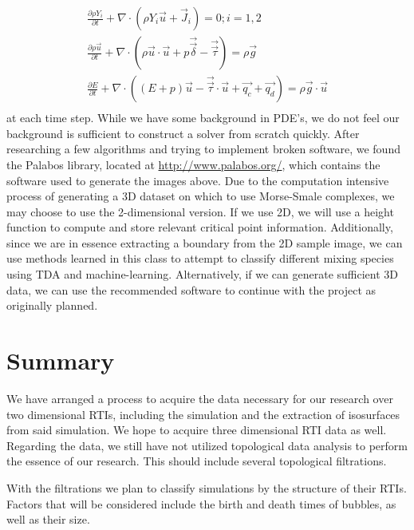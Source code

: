\documentclass[12pt, fullpage,letterpaper]{article}
\begin{document}
	\begin{gather*}
		\frac{\partial \rho Y_i}{\partial t} + \nabla \cdot (\rho Y_i \vec{u} + \vec{J}_i) = 0; i = 1, 2 \\
		\frac{\partial \rho \vec{u}}{\partial t} + \nabla \cdot (\rho \vec{u} \cdot \vec{u} + p \vec{\vec{\delta}} - \vec{\vec{\tau}}) = \rho \vec{g} \\
		\frac{\partial E}{\partial t} + \nabla \cdot ((E + p)\vec{u} -\vec{\vec{\tau}}\cdot \vec{u} + \vec{q_c} + \vec{q_d} ) = \rho \vec{g} \cdot \vec{u} \\
	\end{gather*} 
	at each time step. While we have some background in PDE's, we do not feel our background is sufficient to construct a solver from scratch quickly. After researching a few algorithms and trying to implement broken software, we found the Palabos library, located at \url{http://www.palabos.org/}, which contains the software used to generate the images above. Due to the computation intensive process of generating a 3D dataset on which to use Morse-Smale complexes, we may choose to use the 2-dimensional version. If we use 2D, we will use a height function to compute and store relevant critical point information. Additionally, since we are in essence extracting a boundary from the 2D sample image, we can use methods learned in this class to attempt to classify different mixing species using TDA and machine-learning. Alternatively, if we can generate sufficient 3D data, we can use the recommended software to continue with the project as originally planned.
	
	 	\section*{\normalfont Summary}
	We have arranged a process to acquire the data necessary for our research over two dimensional RTIs, including the simulation and the extraction of isosurfaces from said simulation. We hope to acquire three dimensional RTI data as well. Regarding the data, we still have not utilized topological data analysis to perform the essence of our research. This should include several topological filtrations.
	
	With the filtrations we plan to classify simulations by the structure of their RTIs. Factors that will be considered include the birth and death times of bubbles, as well as their size.
\end{document}

